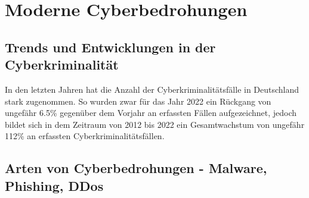 \newpage


\section{Moderne Cyberbedrohungen}\label{sec:moderne-cyberbedrohungen}

\subsection{Trends und Entwicklungen in der Cyberkriminalität}\label{subsec:trends-und-entwicklungen-in-der-cyberkriminalitat}
In den letzten Jahren hat die Anzahl der Cyberkriminalitätsfälle in Deutschland stark zugenommen.
So wurden zwar für das Jahr 2022 ein Rückgang von ungefähr 6.5\% gegenüber dem Vorjahr an erfassten Fällen aufgezeichnet, jedoch bildet sich in dem Zeitraum von 2012 bis 2022 ein Gesamtwachstum von ungefähr 112\% an erfassten Cyberkriminalitätsfällen\autocite[\vglf][]{bka-cyberkriminalitaet}.

\subsection[Arten von Cyberbedrohungen]{Arten von Cyberbedrohungen - Malware, Phishing, DDos}\label{subsec:arten-von-cyberbedrohungen---malware-phishing-ddos}

